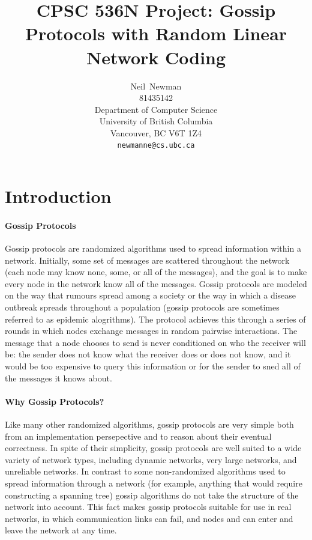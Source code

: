 \documentclass{article} %
\title{CPSC 536N Project: Gossip Protocols with Random Linear Network Coding}
\author{
Neil~Newman\\
81435142\\
Department of Computer Science\\
University of British Columbia\\
Vancouver, BC V6T 1Z4 \\
\texttt{newmanne@cs.ubc.ca}
}
\begin{document}
\maketitle

\section{Introduction}
\paragraph{Gossip Protocols}
Gossip protocols are randomized algorithms used to spread information within a network. Initially, some set of messages are scattered throughout the network (each node may know none, some, or all of the messages), and the goal is to make every node in the network know all of the messages. Gossip protocols are modeled on the way that rumours spread among a society or the way in which a disease outbreak spreads throughout a population (gossip protocols are sometimes referred to as epidemic alogrithms). The protocol achieves this through a series of rounds in which nodes exchange messages in random pairwise interactions. The message that a node chooses to send is never conditioned on who the receiver will be: the sender does not know what the receiver does or does not know, and it would be too expensive to query this information or for the sender to sned all of the messages it knows about.

\paragraph{Why Gossip Protocols?}
Like many other randomized algorithms, gossip protocols are very simple both from an implementation persepective and to reason about their eventual correctness. In spite of their simplicity, gossip protocols are well suited to a wide variety of network types, including dynamic networks, very large networks, and unreliable networks. In contrast to some non-randomized algorithms used to spread information through a network (for example, anything that would require constructing a spanning tree) gossip algorithms do not take the structure of the network into account. This fact makes gossip protocols suitable for use in real networks, in which communication links can fail, and nodes and can enter and leave the network at any time. 
\end{document}
